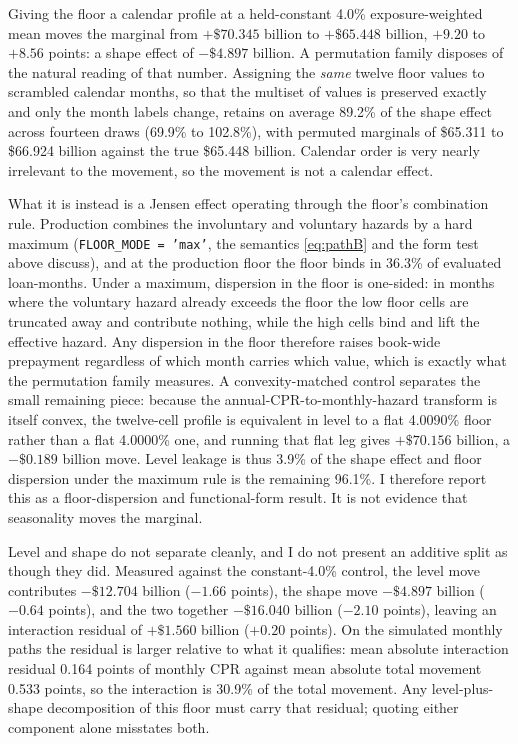 \documentclass[12pt]{article}
\begin{document}
Giving the floor a calendar profile at a held-constant 4.0\% exposure-weighted mean moves the marginal from $+\$70.345$ billion to $+\$65.448$ billion, $+9.20$ to $+8.56$ points: a shape effect of $-\$4.897$ billion. A permutation family disposes of the natural reading of that number. Assigning the \emph{same} twelve floor values to scrambled calendar months, so that the multiset of values is preserved exactly and only the month labels change, retains on average 89.2\% of the shape effect across fourteen draws (69.9\% to 102.8\%), with permuted marginals of \$65.311 to \$66.924 billion against the true \$65.448 billion. Calendar order is very nearly irrelevant to the movement, so the movement is not a calendar effect.

What it is instead is a Jensen effect operating through the floor's combination rule. Production combines the involuntary and voluntary hazards by a hard maximum (\texttt{FLOOR\_MODE = 'max'}, the semantics \eqref{eq:pathB} and the form test above discuss), and at the production floor the floor binds in 36.3\% of evaluated loan-months. Under a maximum, dispersion in the floor is one-sided: in months where the voluntary hazard already exceeds the floor the low floor cells are truncated away and contribute nothing, while the high cells bind and lift the effective hazard. Any dispersion in the floor therefore raises book-wide prepayment regardless of which month carries which value, which is exactly what the permutation family measures. A convexity-matched control separates the small remaining piece: because the annual-CPR-to-monthly-hazard transform is itself convex, the twelve-cell profile is equivalent in level to a flat 4.0090\% floor rather than a flat 4.0000\% one, and running that flat leg gives $+\$70.156$ billion, a $-\$0.189$ billion move. Level leakage is thus 3.9\% of the shape effect and floor dispersion under the maximum rule is the remaining 96.1\%. I therefore report this as a floor-dispersion and functional-form result. It is not evidence that seasonality moves the marginal.

Level and shape do not separate cleanly, and I do not present an additive split as though they did. Measured against the constant-4.0\% control, the level move contributes $-\$12.704$ billion ($-1.66$ points), the shape move $-\$4.897$ billion ($-0.64$ points), and the two together $-\$16.040$ billion ($-2.10$ points), leaving an interaction residual of $+\$1.560$ billion ($+0.20$ points). On the simulated monthly paths the residual is larger relative to what it qualifies: mean absolute interaction residual 0.164 points of monthly CPR against mean absolute total movement 0.533 points, so the interaction is 30.9\% of the total movement. Any level-plus-shape decomposition of this floor must carry that residual; quoting either component alone misstates both.
\end{document}
